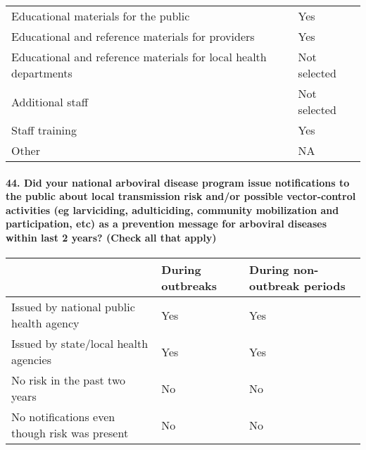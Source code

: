 \documentclass[
]{article}
\begin{document}
\begin{longtable}[]{@{}
  >{\raggedright\arraybackslash}p{}
  >{\raggedright\arraybackslash}p{}@{}}
\toprule
\endhead
Educational materials for the public & Yes \\
Educational and reference materials for providers & Yes \\
Educational and reference materials for local health departments & Not
selected \\
Additional staff & Not selected \\
Staff training & Yes \\
Other & NA \\
\bottomrule
\end{longtable}

\hypertarget{did-your-national-arboviral-disease-program-issue-notifications-to-the-public-about-local-transmission-risk-andor-possible-vector-control-activities-eg-larviciding-adulticiding-community-mobilization-and-participation-etc-as-a-prevention-message-for-arboviral-diseases-within-last-2-years-check-all-that-apply}{%
\paragraph{44. Did your national arboviral disease program issue
notifications to the public about local transmission risk and/or
possible vector-control activities (eg larviciding, adulticiding,
community mobilization and participation, etc) as a prevention message
for arboviral diseases within last 2 years? (Check all that
apply)}\label{did-your-national-arboviral-disease-program-issue-notifications-to-the-public-about-local-transmission-risk-andor-possible-vector-control-activities-eg-larviciding-adulticiding-community-mobilization-and-participation-etc-as-a-prevention-message-for-arboviral-diseases-within-last-2-years-check-all-that-apply}}

\begin{longtable}[]{@{}lll@{}}
\toprule
& During outbreaks & During non-outbreak periods \\
\midrule
\endhead
Issued by national public health agency & Yes & Yes \\
Issued by state/local health agencies & Yes & Yes \\
No risk in the past two years & No & No \\
No notifications even though risk was present & No & No \\
\bottomrule
\end{longtable}
\end{document}
